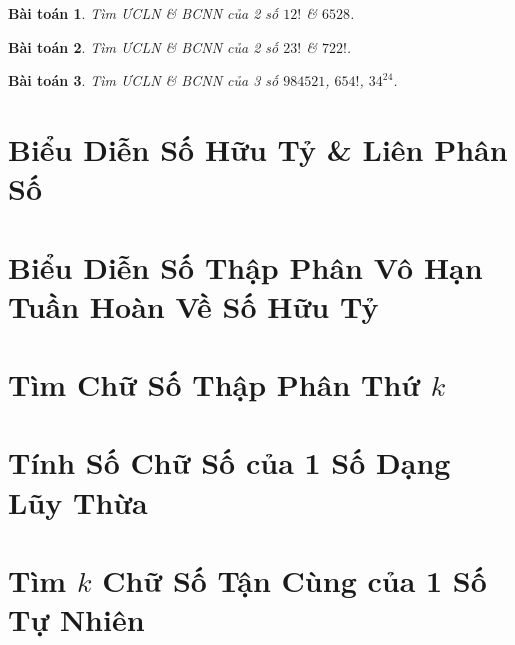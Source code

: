 \documentclass{article}
\newtheorem{baitoan}{Bài toán}
\begin{document}
\begin{baitoan}
	Tìm \emph{ƯCLN} \& \emph{BCNN} của 2 số $12!$ \& $6528$.
\end{baitoan}

\begin{baitoan}
	Tìm \emph{ƯCLN} \& \emph{BCNN} của 2 số $23!$ \& $722!$.
\end{baitoan}

\begin{baitoan}
	Tìm \emph{ƯCLN} \& \emph{BCNN} của 3 số $984521$, $654!$, $34^{24}$.
\end{baitoan}


\section{Biểu Diễn Số Hữu Tỷ \& Liên Phân Số}


\section{Biểu Diễn Số Thập Phân Vô Hạn Tuần Hoàn Về Số Hữu Tỷ}


\section{Tìm Chữ Số Thập Phân Thứ $k$}


\section{Tính Số Chữ Số của 1 Số Dạng Lũy Thừa}


\section{Tìm $k$ Chữ Số Tận Cùng của 1 Số Tự Nhiên}

\end{document}
